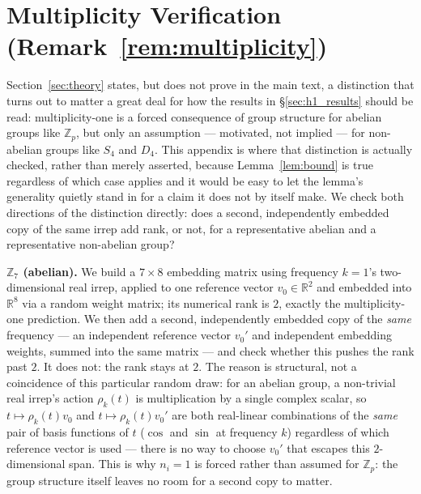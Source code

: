 \documentclass{article}
\begin{document}
\section{Multiplicity Verification (Remark~\ref{rem:multiplicity})}
\label{app:multiplicity}

Section~\ref{sec:theory} states, but does not prove in the main text, a
distinction that turns out to matter a great deal for how the results in
\S\ref{sec:h1_results} should be read: multiplicity-one is a forced
consequence of group structure for abelian groups like $\mathbb{Z}_p$, but
only an assumption --- motivated, not implied --- for non-abelian groups
like $S_4$ and $D_4$. This appendix is where that distinction is actually
checked, rather than merely asserted, because Lemma~\ref{lem:bound} is
true regardless of which case applies and it would be easy to let the
lemma's generality quietly stand in for a claim it does not by itself
make. We check both directions of the distinction directly: does a second,
independently embedded copy of the same irrep add rank, or not, for a
representative abelian and a representative non-abelian group?

\textbf{$\mathbb{Z}_7$ (abelian).} We build a $7\times 8$ embedding matrix
using frequency $k=1$'s two-dimensional real irrep, applied to one
reference vector $v_0\in\mathbb{R}^2$ and embedded into $\mathbb{R}^8$ via
a random weight matrix; its numerical rank is $2$, exactly the
multiplicity-one prediction. We then add a second, independently embedded
copy of the \emph{same} frequency --- an independent reference vector
$v_0'$ and independent embedding weights, summed into the same matrix ---
and check whether this pushes the rank past $2$. It does not: the rank
stays at $2$. The reason is structural, not a coincidence of this
particular random draw: for an abelian group, a non-trivial real irrep's
action $\rho_k(t)$ is multiplication by a single complex scalar, so
$t \mapsto \rho_k(t)v_0$ and $t \mapsto \rho_k(t)v_0'$ are both real-linear
combinations of the \emph{same} pair of basis functions of $t$ ($\cos$ and
$\sin$ at frequency $k$) regardless of which reference vector is used ---
there is no way to choose $v_0'$ that escapes this $2$-dimensional span.
This is why $n_i=1$ is forced rather than assumed for $\mathbb{Z}_p$: the
group structure itself leaves no room for a second copy to matter.
\end{document}
